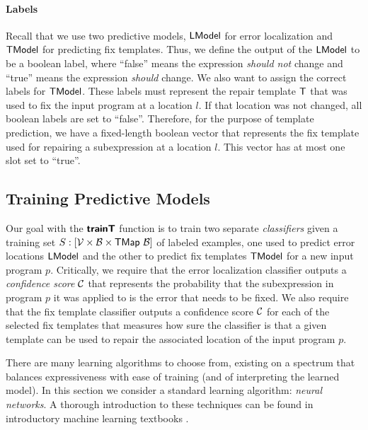 \paragraph{Labels}
Recall that we use two predictive models, $\mathsf{LModel}$ for error localization and
$\mathsf{TModel}$ for predicting fix templates. Thus, we define the output of the
$\mathsf{LModel}$ to be a boolean label, where ``false'' means the expression
\emph{should not} change and ``true'' means the expression \emph{should} change.
We also want to assign the correct labels for $\mathsf{TModel}$. These labels must
represent the repair template $\mathsf{T}$ that was used to fix the input program at a
location $l$. If that location was not changed, all boolean labels are set to
``false''. Therefore, for the purpose of template prediction, we have a
fixed-length boolean vector that represents the fix template used for repairing
a subexpression at a location $l$. This vector has at most one slot set to
``true''.

\subsection{Training Predictive Models}
\label{subsec:train}
\lstDeleteShortInline{|} %

Our goal with the $\bm{\mathsf{trainT}}$ function is to train two separate
\emph{classifiers} given a training set $S : [\mathcal{V} \times \mathcal{B} \times
\mathsf{TMap}\ \mathcal{B}]$ of labeled examples, one used to predict error locations $\mathsf{LModel}$
and the other to predict fix templates $\mathsf{TModel}$ for a new input program $p$.
Critically, we require that the error localization classifier outputs a
\emph{confidence score} $\mathcal{C}$ that represents the probability that the
subexpression in program $p$ it was applied to is the error that needs to be
fixed. We also require that the fix template classifier outputs a confidence
score $\mathcal{C}$ for each of the selected fix templates that measures how sure the
classifier is that a given template can be used to repair the associated
location of the input program $p$.

There are many learning algorithms to choose from, existing on a spectrum that
balances expressiveness with ease of training (and of interpreting the learned
model). In this section we consider a standard learning algorithm: \emph{neural
networks}. A thorough introduction to these techniques can be found in
introductory machine learning textbooks \citep[\eg][]{Hastie2009-bn}.



